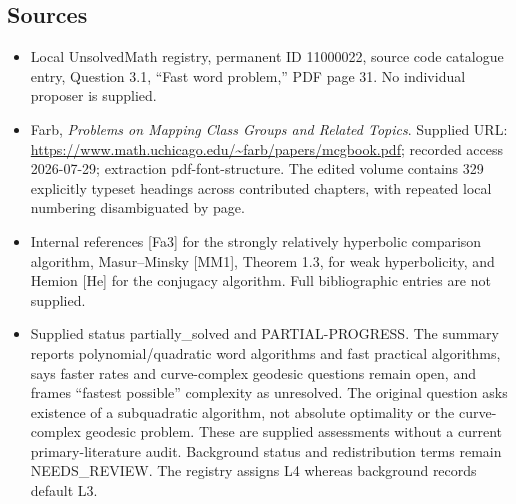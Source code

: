 \documentclass[11pt]{article}
\begin{document}
\subsection{Sources}
\begin{itemize}
\item Local UnsolvedMath registry, permanent ID 11000022, source code catalogue entry, Question 3.1, ``Fast word problem,'' PDF page 31. No individual proposer is supplied.
\item Farb, \emph{Problems on Mapping Class Groups and Related Topics}. Supplied URL: \url{https://www.math.uchicago.edu/~farb/papers/mcgbook.pdf}; recorded access 2026-07-29; extraction pdf-font-structure. The edited volume contains 329 explicitly typeset headings across contributed chapters, with repeated local numbering disambiguated by page.
\item Internal references [Fa3] for the strongly relatively hyperbolic comparison algorithm, Masur--Minsky [MM1], Theorem 1.3, for weak hyperbolicity, and Hemion [He] for the conjugacy algorithm. Full bibliographic entries are not supplied.
\item Supplied status partially\_solved and PARTIAL-PROGRESS. The summary reports polynomial/quadratic word algorithms and fast practical algorithms, says faster rates and curve-complex geodesic questions remain open, and frames ``fastest possible'' complexity as unresolved. The original question asks existence of a subquadratic algorithm, not absolute optimality or the curve-complex geodesic problem. These are supplied assessments without a current primary-literature audit. Background status and redistribution terms remain NEEDS\_REVIEW. The registry assigns L4 whereas background records default L3.
\end{itemize}
\end{document}
